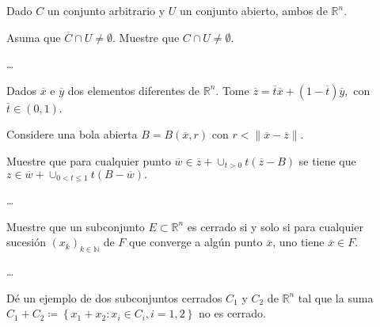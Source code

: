 \documentclass{testfcuni} %
\begin{document}
\begin{questions}
  \question

  Dado $C$ un conjunto arbitrario y $U$ un conjunto abierto, ambos de
  $\mathds{R}^{n}$.

  Asuma que $\overline{C}\cap U\neq\emptyset$.
  Muestre que $C\cap U\neq\emptyset$.

  \begin{solution}
    \ldots
  \end{solution}

  \question

  Dados $\overline{x}$ e $\overline{y}$ dos elementos diferentes de
  $\mathds{R}^{n}$.
  Tome
  \begin{math}
    \overline{z}=
    \overline{t}\overline{x}+
    \left(1-\overline{t}\right)
    \overline{y},
  \end{math}
  con $\overline{t}\in\left(0,1\right)$.

  Considere una bola abierta $B=B\left(\overline{x},r\right)$ con
  $r<\|\overline{x}-\overline{z}\|$.

  Muestre que para cualquier punto
  \begin{math}
    \overline{w}\in
    \overline{z}+
    \cup_{t>0}t
    \left(\overline{z}-B\right)
  \end{math}
  se tiene que
  \begin{math}
    z\in\overline{w}+
    \cup_{0<t\leq1}t
    \left(B-\overline{w}\right).
  \end{math}

  \begin{solution}
    \ldots
  \end{solution}

  \question

  Muestre que un subconjunto $E\subset\mathds{R}^{n}$ es cerrado si y
  solo si para cualquier sucesión
  ${\left(x_{k}\right)}_{k\in\mathds{N}}$ de $F$ que converge a algún
  punto $\overline{x}$, uno tiene $\overline{x}\in F$.

  \begin{solution}
    \ldots
  \end{solution}

  \question

  Dé un ejemplo de dos subconjuntos cerrados $C_{1}$ y $C_{2}$ de
  $\mathds{R}^{n}$ tal que la suma
  \begin{math}
    C_{1}+
    C_{2}\coloneqq
    \left\{
    x_{1}+
    x_{2}:
    x_{i}\in C_{i},
    i=1,2
    \right\}
  \end{math}
  no es cerrado.


\end{questions}
\end{document}
